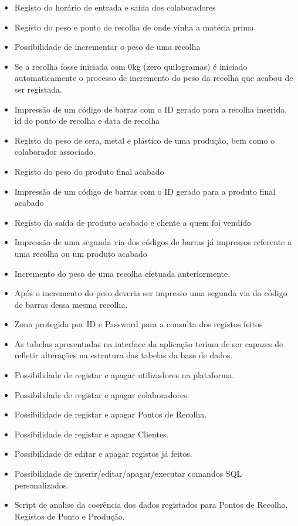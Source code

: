 \begin{itemize}
	\item Registo do horário de entrada e saída dos colaboradores
	\item Registo do peso e ponto de recolha de onde vinha a matéria prima
	\item Possibilidade de incrementar o peso de uma recolha
	\item Se a recolha fosse iniciada com 0kg (zero quilogramas) é iniciado automaticamente o processo de incremento do peso da recolha que acabou de ser registada.
	\item Impressão de um código de barras com o ID gerado para a recolha inserida, id do ponto de recolha e data de recolha
	\item Registo do peso de cera, metal e plástico de uma produção, bem como o colaborador associado.
	\item Registo do peso do produto final acabado
	\item Impressão de um código de barras com o ID gerado para a produto final acabado
	\item Registo da saída de produto acabado e cliente a quem foi vendido
	\item Impressão de uma segunda via dos códigos de barras já impressos referente a uma recolha ou um produto acabado
	\item Incremento do peso de uma recolha efetuada anteriormente.
	\item Após o incremento do peso deveria ser impresso uma segunda via do código de barras dessa mesma recolha.
	\item Zona protegida por ID e Password para a consulta dos registos feitos
	\item As tabelas apresentadas na interface da aplicação teriam de ser capazes de refletir alterações na estrutura das tabelas da base de dados.
	\item Possibilidade de registar e apagar utilizadores na plataforma.
	\item Possibilidade de registar e apagar colaboradores.
	\item Possibilidade de registar e apagar Pontos de Recolha.
	\item Possibilidade de registar e apagar Clientes.
	\item Possibilidade de editar e apagar registos já feitos.
	\item Possibilidade de inserir/editar/apagar/executar comandos SQL personalizados.
	\item Script de analise da coerência dos dados registados para Pontos de Recolha, Registos de Ponto e Produção.
\end{itemize}